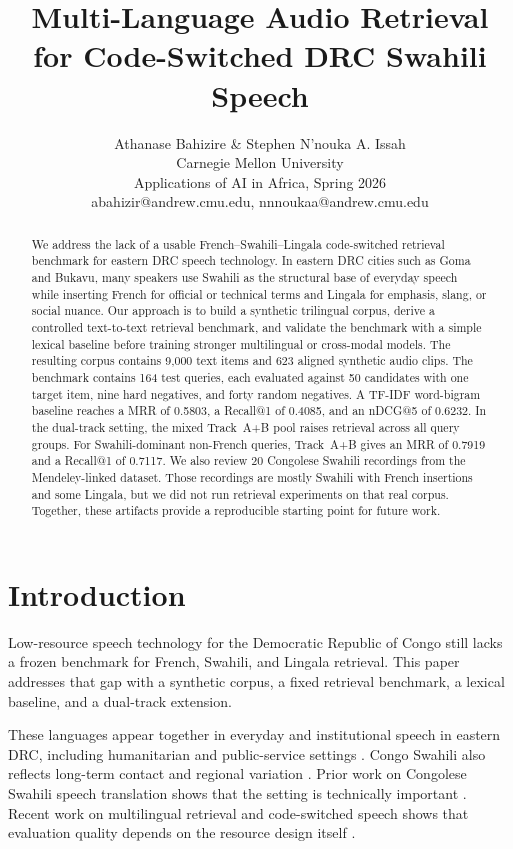 \documentclass[11pt,twocolumn]{article}
\title{Multi-Language Audio Retrieval for Code-Switched DRC Swahili Speech}
\author{Athanase Bahizire \& Stephen N'nouka A. Issah\\
Carnegie Mellon University\\
Applications of AI in Africa, Spring 2026\\
abahizir@andrew.cmu.edu, nnnoukaa@andrew.cmu.edu}
\date{}
\begin{document}
\maketitle

\begin{abstract}
We address the lack of a usable French--Swahili--Lingala code-switched retrieval benchmark for eastern DRC speech technology. In eastern DRC cities such as Goma and Bukavu, many speakers use Swahili as the structural base of everyday speech while inserting French for official or technical terms and Lingala for emphasis, slang, or social nuance. Our approach is to build a synthetic trilingual corpus, derive a controlled text-to-text retrieval benchmark, and validate the benchmark with a simple lexical baseline before training stronger multilingual or cross-modal models. The resulting corpus contains 9{,}000 text items and 623 aligned synthetic audio clips. The benchmark contains 164 test queries, each evaluated against 50 candidates with one target item, nine hard negatives, and forty random negatives. A TF-IDF word-bigram baseline reaches a MRR of 0.5803, a Recall@1 of 0.4085, and an nDCG@5 of 0.6232. In the dual-track setting, the mixed Track~A+B pool raises retrieval across all query groups. For Swahili-dominant non-French queries, Track~A+B gives an MRR of 0.7919 and a Recall@1 of 0.7117. We also review 20 Congolese Swahili recordings from the Mendeley-linked dataset. Those recordings are mostly Swahili with French insertions and some Lingala, but we did not run retrieval experiments on that real corpus. Together, these artifacts provide a reproducible starting point for future work.
\end{abstract}

\section{Introduction}
Low-resource speech technology for the Democratic Republic of Congo still lacks a frozen benchmark for French, Swahili, and Lingala retrieval. This paper addresses that gap with a synthetic corpus, a fixed retrieval benchmark, a lexical baseline, and a dual-track extension.

These languages appear together in everyday and institutional speech in eastern DRC, including humanitarian and public-service settings \cite{kimanuka2025tods}. Congo Swahili also reflects long-term contact and regional variation \cite{fabian1991colonial}. Prior work on Congolese Swahili speech translation shows that the setting is technically important \cite{denisov2021ims,oktem2021mt}. Recent work on multilingual retrieval and code-switched speech shows that evaluation quality depends on the resource design itself \cite{cui2015multilingual,yan2025csfleurs}.
\end{document}
